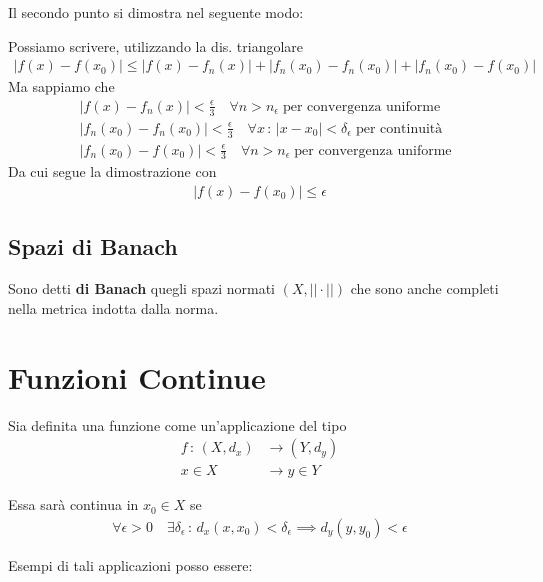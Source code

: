 Il secondo punto si dimostra nel seguente modo:

Possiamo scrivere, utilizzando la dis. triangolare
\begin{align}
|f(x) - f(x_0)| \leq |f(x) - f_n(x)| + |f_n(x_0) - f_n(x_0)| + |f_n(x_0) - f(x_0)|
\end{align}
Ma sappiamo che
\begin{align}
{}&|f(x) - f_n(x)|<\frac{\epsilon}{3} \quad \forall n>n_\epsilon \; \text{per convergenza uniforme}\\
&|f_n(x_0) - f_n(x_0)|<\frac{\epsilon}{3} \quad \forall x \, : \, |x-x_0|<\delta_\epsilon \; \text{per continuità} \\
&|f_n(x_0) - f(x_0)|<\frac{\epsilon}{3} \quad \forall n>n_\epsilon \; \text{per convergenza uniforme}
\end{align}
Da cui segue la dimostrazione con
\begin{align}
|f(x) - f(x_0)| \leq \epsilon
\end{align}

\subsection{Spazi di Banach}

Sono detti \textbf{di Banach} quegli spazi normati $(X,||\cdot||)$ che sono anche completi nella metrica indotta dalla norma.

\newpage

\section{Funzioni Continue}

Sia definita una funzione come un'applicazione del tipo
\begin{align}
f \, : \, (X,d_x) {}&\longrightarrow (Y,d_y)\\
x \in X &\longrightarrow y \in Y
\end{align}

Essa sarà continua in $x_0 \in X$ se 
\begin{align}
\forall \epsilon >0 \quad \exists \delta_\epsilon \, : \, d_x(x,x_0)<\delta_\epsilon \implies d_y(y,y_0)<\epsilon
\end{align}

\bigskip

Esempi di tali applicazioni posso essere:

